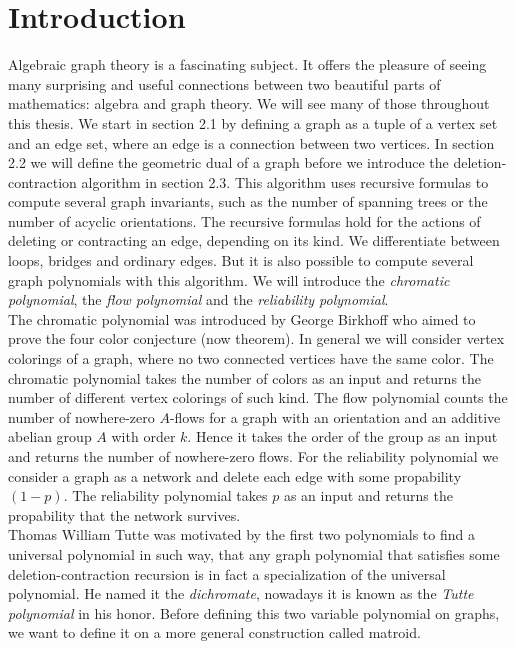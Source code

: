 \documentclass[12pt,a4paper, twoside, autooneside=false]{scrartcl}
\theoremstyle{definition}
\theoremstyle{remark}
\numberwithin{equation}{section}
\begin{document}
\section{Introduction}
Algebraic graph theory is a fascinating subject. It offers the pleasure of seeing many surprising and useful connections between two beautiful parts of mathematics: algebra and graph theory. We will see many of those throughout this thesis. We start in section 2.1 by defining a graph as a tuple of a vertex set and an edge set, where an edge is a connection between two vertices. In section 2.2 we will define the geometric dual of a graph before we introduce the deletion-contraction algorithm in section 2.3. This algorithm uses recursive formulas to compute several graph invariants, such as the number of spanning trees or the number of acyclic orientations. The recursive formulas hold for the actions of deleting or contracting an edge, depending on its kind. We differentiate between loops, bridges and ordinary edges. But it is also possible to compute several graph polynomials with this algorithm. We will introduce the \textit{chromatic polynomial}, the \textit{flow polynomial} and the \textit{reliability polynomial}. \\
\indent The chromatic polynomial was introduced by George Birkhoff who aimed to prove the four color conjecture (now theorem). In general we will consider vertex colorings of a graph, where no two connected vertices have the same color. The chromatic polynomial takes the number of colors as an input and returns the number of different vertex colorings of such kind. The flow polynomial counts the number of nowhere-zero $A$-flows for a graph with an orientation and an additive abelian group $A$ with order $k$. Hence it takes the order of the group as an input and returns the number of nowhere-zero flows. For the reliability polynomial we consider a graph as a network and delete each edge with some propability $(1 - p)$. The reliability polynomial takes $p$ as an input and returns the propability that the network survives. \\ 
\indent
Thomas William Tutte \cite{Tu1947} was motivated by the first two polynomials to find a universal polynomial in such way, that any graph polynomial that satisfies some deletion-contraction recursion is in fact a specialization of the universal polynomial.
He named it the \textit{dichromate}, nowadays it is known as the \textit{Tutte polynomial} in his honor. Before defining this two variable polynomial on graphs, we want to define it on a more general construction called matroid. \\
\end{document}
